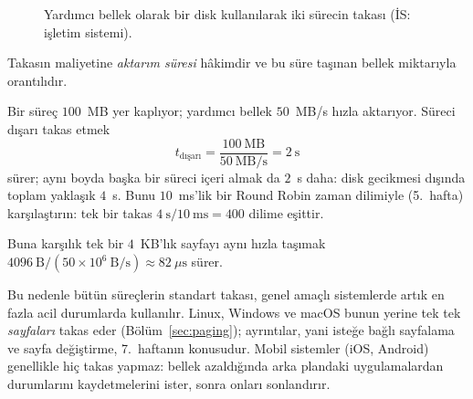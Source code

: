 \documentclass[11pt,a4paper]{article}
\begin{document}
\begin{figure}[H]
\centering
{}
\caption{Yardımcı bellek olarak bir disk kullanılarak iki sürecin takası (İS: işletim sistemi).}
\end{figure}

Takasın maliyetine \emph{aktarım süresi} hâkimdir ve bu süre taşınan bellek miktarıyla orantılıdır.

\begin{example}
Bir süreç $100$~MB yer kaplıyor; yardımcı bellek $50$~MB/s hızla aktarıyor. Süreci dışarı takas etmek
\[
t_{\text{dışarı}} = \frac{100\ \text{MB}}{50\ \text{MB/s}} = 2\ \text{s}
\]
sürer; aynı boyda başka bir süreci içeri almak da $2$~s daha: disk gecikmesi dışında toplam yaklaşık $4$~s. Bunu $10$~ms'lik bir Round Robin zaman dilimiyle (5.~hafta) karşılaştırın: tek bir takas $4\ \text{s} / 10\ \text{ms} = 400$ dilime eşittir.

Buna karşılık tek bir $4$~KB'lık sayfayı aynı hızla taşımak $4096\ \text{B} / (50\times10^{6}\ \text{B/s}) \approx 82\ \mu\text{s}$ sürer.
\end{example}

Bu nedenle bütün süreçlerin standart takası, genel amaçlı sistemlerde artık en fazla acil durumlarda kullanılır. Linux, Windows ve macOS bunun yerine tek tek \emph{sayfaları} takas eder (Bölüm~\ref{sec:paging}); ayrıntılar, yani isteğe bağlı sayfalama ve sayfa değiştirme, 7.~haftanın konusudur. Mobil sistemler (iOS, Android) genellikle hiç takas yapmaz: bellek azaldığında arka plandaki uygulamalardan durumlarını kaydetmelerini ister, sonra onları sonlandırır.
\end{document}
